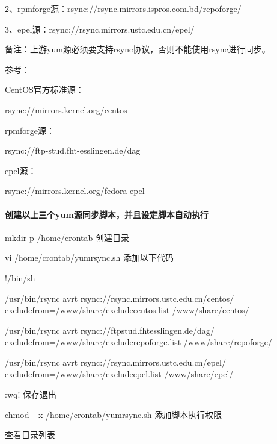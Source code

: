 \documentclass[letterpaper,10pt,english]{sphinxmanual}
\begin{document}
2、rpmforge源：rsync://rsync.mirrors.ispros.com.bd/repoforge/

3、epel源：rsync://rsync.mirrors.ustc.edu.cn/epel/

备注：上游yum源必须要支持rsync协议，否则不能使用rsync进行同步。

参考：

CentOS官方标准源：

rsync://mirrors.kernel.org/centos

rpmforge源：


rsync://ftp-stud.fht-esslingen.de/dag

epel源：


rsync://mirrors.kernel.org/fedora-epel


\paragraph{创建以上三个yum源同步脚本，并且设定脚本自动执行}
\label{\detokenize{software_manage/yum/yum_official_sync:id7}}
%
\begin{sphinxVerbatim}[commandchars=\\\{\}]
mkdir \PYGZhy{}p /home/crontab \PYGZsh{}创建目录

vi /home/crontab/yum\PYGZus{}rsync.sh \PYGZsh{}添加以下代码

\PYGZsh{}!/bin/sh

/usr/bin/rsync \PYGZhy{}avrt rsync://rsync.mirrors.ustc.edu.cn/centos/ \PYGZhy{}\PYGZhy{}exclude\PYGZhy{}from=/www/share/exclude\PYGZus{}centos.list /www/share/centos/

/usr/bin/rsync \PYGZhy{}avrt rsync://ftp\PYGZhy{}stud.fht\PYGZhy{}esslingen.de/dag/ \PYGZhy{}\PYGZhy{}exclude\PYGZhy{}from=/www/share/exclude\PYGZus{}repoforge.list /www/share/repoforge/

/usr/bin/rsync \PYGZhy{}avrt rsync://rsync.mirrors.ustc.edu.cn/epel/ \PYGZhy{}\PYGZhy{}exclude\PYGZhy{}from=/www/share/exclude\PYGZus{}epel.list /www/share/epel/

:wq! \PYGZsh{}保存退出

chmod +x /home/crontab/yum\PYGZus{}rsync.sh \PYGZsh{}添加脚本执行权限
\end{sphinxVerbatim}

查看目录列表

%
\begin{sphinxVerbatim}[commandchars=\\\{\}]
   
\end{sphinxVerbatim}
\end{document}
